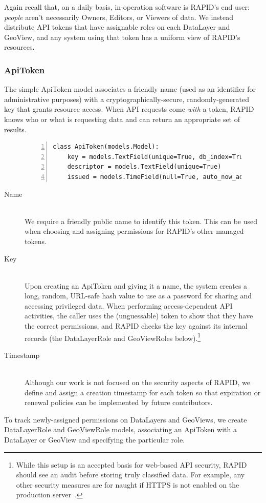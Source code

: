Again recall that, on a daily basis, in-operation software is RAPID's end user: \textit{people} aren't necessarily Owners, Editors, or Viewers of data. We instead distribute API tokens that have assignable roles on each DataLayer and GeoView, and any system using that token has a uniform view of RAPID's resources.

\subsubsection{ApiToken}
The simple ApiToken model associates a friendly name (used as an identifier for administrative purposes) with a cryptographically-secure, randomly-generated key that grants resource access. When API requests come \textit{with} a token, RAPID knows who or what is requesting data and can return an appropriate set of results.


\begin{figure}
\begin{Verbatim}[samepage=true,baselinestretch=1,numbers=left,xleftmargin=12mm]
class ApiToken(models.Model):
    key = models.TextField(unique=True, db_index=True)
    descriptor = models.TextField(unique=True)
    issued = models.TimeField(null=True, auto_now_add=True)
\end{Verbatim}
\label{fig:apitoken}
\end{figure}

\begin{description}
\item[Name] \hfill \\
We require a friendly public name to identify this token. This can be used when choosing and assigning permissions for RAPID's other managed tokens.

\item[Key] \hfill \\
Upon creating an ApiToken and giving it a name, the system creates a long, random, URL-safe hash value to use as a password for sharing and accessing privileged data. When performing access-dependent API activities, the caller uses the (unguessable) token to show that they have the correct permissions, and RAPID checks the key against its internal records (the DataLayerRole and GeoViewRoles below).\footnote{While this setup is an accepted basis for web-based API security, RAPID should see an audit before storing truly classified data. For example, any other security measures are for naught if HTTPS is not enabled on the production server~\cite{Stormpath,Palmer}. }

\item[Timestamp] \hfill \\
Although our work is not focused on the security aspects of RAPID, we define and assign a creation timestamp for each token so that expiration or renewal policies can be implemented by future contributors.

\end{description}
To track newly-assigned permissions on DataLayers and GeoViews, we create DataLayerRole and GeoViewRole models, associating an ApiToken with a DataLayer or GeoView and specifying the particular role.


